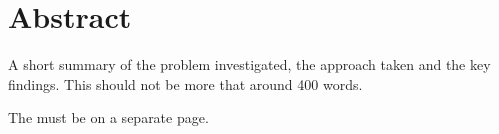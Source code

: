 \chapter*{Abstract}
A short summary of the problem investigated, the approach taken and the key findings. This should not be more that around 400 words.

The must be on a separate page.

\newpage